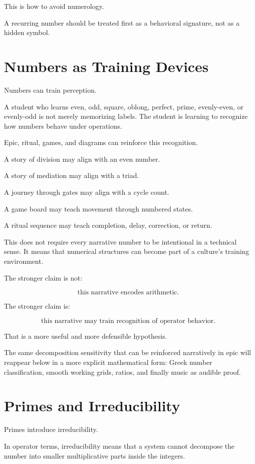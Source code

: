 \documentclass[11pt]{book}
\begin{document}
This is how to avoid numerology.

A recurring number should be treated first as a behavioral signature, not as a hidden symbol.

\section{Numbers as Training Devices}

Numbers can train perception.

A student who learns even, odd, square, oblong, perfect, prime, evenly-even, or evenly-odd is not merely memorizing labels. The student is learning to recognize how numbers behave under operations.

Epic, ritual, games, and diagrams can reinforce this recognition.

A story of division may align with an even number.

A story of mediation may align with a triad.

A journey through gates may align with a cycle count.

A game board may teach movement through numbered states.

A ritual sequence may teach completion, delay, correction, or return.

This does not require every narrative number to be intentional in a technical sense. It means that numerical structures can become part of a culture's training environment.

The stronger claim is not:

\[
\text{this narrative encodes arithmetic}.
\]

The stronger claim is:

\[
\text{this narrative may train recognition of operator behavior}.
\]

That is a more useful and more defensible hypothesis.

The same decomposition sensitivity that can be reinforced narratively in epic will reappear below in a more explicit mathematical form: Greek number classification, smooth working grids, ratios, and finally music as audible proof.

\section{Primes and Irreducibility}

Primes introduce irreducibility.

In operator terms, irreducibility means that a system cannot decompose the number into smaller multiplicative parts inside the integers.
\end{document}
